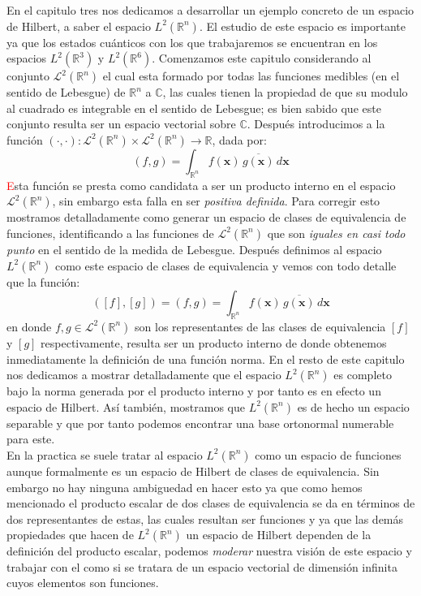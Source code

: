 \documentclass[12pt]{book}
\numberwithin{equation}{chapter}
\def\ol{\overline}
\def\R{\mathbb{R}}
\def\C{\mathbb{C}}
\def\L{\mathcal{L}}
\def\rar{\rightarrow}
\def\x{\mathbf{x}}
\begin{document}
En el capitulo tres nos dedicamos a desarrollar un ejemplo concreto de un espacio de Hilbert, a saber el espacio $L^{2}(\R^{n})$. El estudio de este espacio es importante ya que los estados cu\'anticos con los que trabajaremos se encuentran en los espacios $L^{2}(\R^{3})$ y $L^{2}(\R^{6})$. Comenzamos este capitulo considerando al conjunto $\L^{2}(\R^{n})$ el cual esta formado por todas las funciones medibles (en el sentido de Lebesgue) de $\R^{n}$ a $\C$, las cuales tienen la propiedad de que su modulo al cuadrado es integrable en el sentido de Lebesgue; es bien sabido que este conjunto resulta ser un espacio vectorial sobre $\C$. Despu\'es introducimos a la funci\'on $ ( \cdot ,\cdot ): \L^{2}(\R^{n}) \times \L^{2}(\R^{n}) \rar \R $, dada por:
$$ ( f,g )= \int_{\R^{n}} f(\x)\, \ol{g(\x)} \, d\x $$
\textcolor{red}{E}sta funci\'on se presta como candidata a ser un producto interno en el espacio $\L^{2}(\R^{n})$, sin embargo esta falla en ser \emph{positiva definida}. Para corregir esto mostramos detalladamente como generar un espacio de clases de equivalencia de funciones, identificando a las funciones de $\L^{2}(\R^{n})$ que son \emph{iguales en casi todo punto} en el sentido de la medida de Lebesgue. Despu\'es definimos al espacio $L^{2}(\R^{n})$ como este espacio de clases de equivalencia y vemos con todo detalle que la funci\'on: 
$$ ([f],[g])= ( f,g )= \int_{\R^{n}} f(\x)\, \ol{g(\x)} \, d\x $$
en donde $f,g \in \L^{2}(\R^{n})$ son los representantes de las clases de equivalencia $[f]$ y $[g]$ respectivamente, resulta ser un producto interno de donde obtenemos inmediatamente la definici\'on de una funci\'on norma. En el resto de este capitulo nos dedicamos a mostrar detalladamente que el espacio $L^{2}(\R^{n})$ es completo bajo la norma generada por el producto interno y por tanto es en efecto un espacio de Hilbert. As\'i tambi\'en, mostramos que $L^{2}(\R^{n})$ es de hecho un espacio separable  y que por tanto podemos encontrar una base ortonormal numerable para este.\\
En la practica se suele tratar al espacio $L^{2}(\R^{n})$ como un espacio de funciones aunque formalmente es un espacio de Hilbert de clases de equivalencia. Sin embargo no hay ninguna ambiguedad en hacer esto ya que como hemos mencionado el producto escalar de dos clases de equivalencia se da en t\'erminos de dos representantes de estas, las cuales resultan ser funciones y ya que las dem\'as propiedades que hacen de $L^{2}(\R^{n})$ un espacio de Hilbert dependen de la definici\'on del producto escalar, podemos \emph{moderar} nuestra visi\'on de este espacio y trabajar con el como si se tratara de un espacio vectorial de dimensi\'on infinita cuyos elementos son funciones.\\
\end{document}
